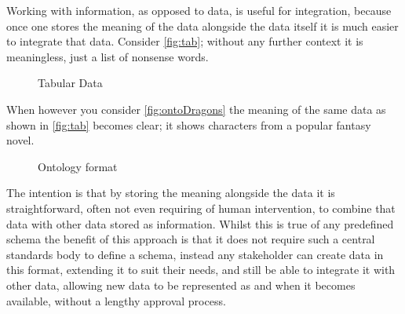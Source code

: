 Working with information, as opposed to data, is useful for integration, because once one stores the meaning of the data alongside the data itself it is much easier to integrate that data. Consider \autoref{fig:tab}; without any further context it is meaningless, just a list of nonsense words.

\begin{figure}[!htbp]
\myfloatalign
{}
\caption{Tabular Data}
\label{fig:tab}
\end{figure}

 When however you consider \autoref{fig:ontoDragons} the meaning of the same data as shown in \autoref{fig:tab} becomes clear; it shows characters from a popular fantasy novel. 

\begin{figure}[!htbp]
\myfloatalign
{}
\caption{Ontology format}
\label{fig:ontoDragons}
\end{figure}

The intention is that by storing the meaning alongside the data it is straightforward, often not even requiring of human intervention, to combine that data with other data stored as information. Whilst this is true of any predefined schema the benefit of this approach is that it does not require such a central standards body to define a schema, instead any stakeholder can create data in this format, extending it to suit their needs, and still be able to integrate it with other data, allowing new data to be represented as and when it becomes available, without a lengthy approval process. 

